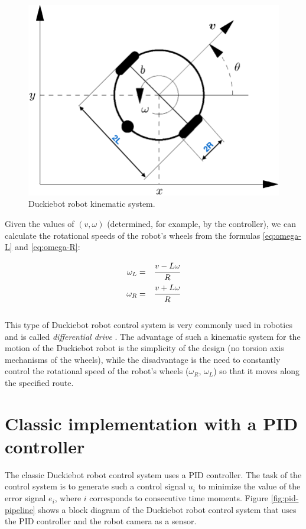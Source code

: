 \documentclass[conference]{IEEEtran}
\begin{document}
\begin{figure}[h]
    \centering
    \includegraphics[width=.8\columnwidth]{dt-kinematic}
    \caption{Duckiebot robot kinematic system.}
    \label{fig:duckiebot-kinematics}
\end{figure}

Given the values of $(v, \omega)$ (determined, for example, by the controller), we can calculate the rotational speeds of the robot's wheels from the formulas \eqref{eq:omega-L} and \eqref{eq:omega-R}:

\begin{eqnarray}
	\omega_L & = & \cfrac{v-L\omega}{R} \label{eq:omega-L} \\
	\omega_R & = & \cfrac{v+L\omega}{R} \label{eq:omega-R}
\end{eqnarray}
\\
This type of Duckiebot robot control system is very commonly used in robotics and is called \emph{differential drive} \cite{siegwart2011introduction}. The advantage of such a kinematic system for the motion of the Duckiebot robot is the simplicity of the design (no torsion axis mechanisms of the wheels), while the disadvantage is the need to constantly control the rotational speed of the robot's wheels ($\omega_R$, $\omega_L$) so that it moves along the specified route.


\section{Classic implementation with a PID controller}\label{sec:pid-controller}
The classic Duckiebot robot control system uses a PID controller. The task of the control system is to generate such a control signal $u_i$ to minimize the value of the error signal $e_i$, where $i$ corresponds to consecutive time moments. Figure \ref{fig:pid-pipeline} shows a block diagram of the Duckiebot robot control system that uses the PID controller and the robot camera as a sensor.
\end{document}
